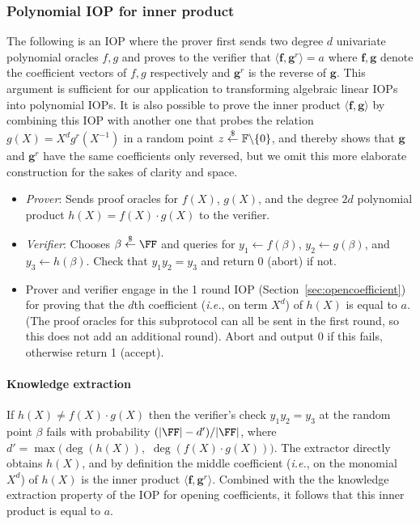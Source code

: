  

\subsubsection{Polynomial IOP for inner product}\label{sec:innerproduct}
The following is an IOP where the prover first sends two degree $d$ univariate polynomial oracles $f, g$ and proves to the verifier that $\langle \mathbf{f}, \mathbf{g}^r \rangle = a$ where $\mathbf{f}, \mathbf{g}$ denote the coefficient vectors of $f, g$ respectively and $\mathbf{g}^r$ is the reverse of $\mathbf{g}$. This argument is sufficient for our application to transforming algebraic linear IOPs into polynomial IOPs. It is also possible to prove the inner product $\langle \mathbf{f}, \mathbf{g} \rangle$ by combining this IOP with another one that probes the relation $g(X) = X^dg^r(X^{-1})$ in a random point $z \overset{\$}{\gets} \mathbb{F} \backslash \{0\}$, and thereby shows that $\mathbf{g}$ and $\mathbf{g}^r$ have the same coefficients only reversed, but we omit this more elaborate construction for the sakes of clarity and space.

\begin{itemize}
\item \emph{Prover}: Sends proof oracles for $f(X)$, $g(X)$, and the degree $2d$ polynomial product $h(X) = f(X)\cdot g(X)$ to the verifier. 
\item \emph{Verifier}: Chooses $\beta \sample \FF$ and queries for $y_1 \leftarrow f(\beta)$, $y_2 \leftarrow g(\beta)$, and $y_3 \leftarrow h(\beta)$. Check that $y_1 y_2 = y_3$ and return $0$ (abort) if not.
\item Prover and verifier engage in the 1 round IOP (Section~\ref{sec:opencoefficient}) for proving that the $d$th coefficient (\emph{i.e.}, on term $X^d$) of $h(X)$ is equal to $a$. (The proof oracles for this subprotocol can all be sent in the first round, so this does not add an additional round). Abort and output $0$ if this fails, otherwise return 1 (accept). 
\end{itemize}

\paragraph{Knowledge extraction} If $h(X) \neq f(X) \cdot g(X)$ then the verifier's check $y_1 y_2 = y_3$ at the random point $\beta$ fails with probability $(|\FF| - d')/|\FF|$, where $d' = \max(\deg(h(X)),$ $\deg(f(X)\cdot{}g(X)))$. The extractor directly obtains $h(X)$, and by definition the middle coefficient (\emph{i.e.}, on the monomial $X^d$) of $h(X)$ is the inner product $\langle \mathbf{f}, \mathbf{g}^r \rangle$. Combined with the the knowledge extraction property of the IOP for opening coefficients, it follows that this inner product is equal to $a$.  

